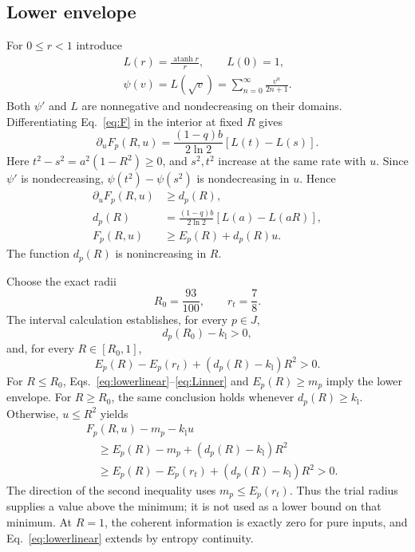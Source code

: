 \documentclass[aps,pra,reprint,amsmath,amssymb,longbibliography,nofootinbib]{revtex4-2}
\newcommand{\atanh}{\operatorname{atanh}}
\newcommand{\kl}{k_{\mathrm l}}
\begin{document}
\subsection{Lower envelope}
For $0\le r<1$ introduce
\begin{equation}
 \begin{gathered}
 L(r)=\frac{\atanh r}{r},\qquad L(0)=1,\\
 \psi(v)=L(\sqrt v)=\sum_{n=0}^{\infty}\frac{v^n}{2n+1}.
 \end{gathered}
 \label{eq:psi}
\end{equation}
Both $\psi'$ and $L$ are nonnegative and nondecreasing on their domains. Differentiating Eq.~\eqref{eq:F} in the interior at fixed $R$ gives
\begin{equation}
 \partial_uF_p(R,u)=\frac{(1-q)b}{2\ln2}[L(t)-L(s)].
 \label{eq:Fu}
\end{equation}
Here $t^2-s^2=a^2(1-R^2)\ge0$, and $s^2,t^2$ increase at the same rate with $u$. Since $\psi'$ is nondecreasing, $\psi(t^2)-\psi(s^2)$ is nondecreasing in $u$. Hence
\begin{align}
 \partial_uF_p(R,u)&\ge d_p(R),\nonumber\\
 d_p(R)&=\frac{(1-q)b}{2\ln2}[L(a)-L(aR)],\label{eq:d}\\
 F_p(R,u)&\ge E_p(R)+d_p(R)u.\label{eq:lowerlinear}
\end{align}
The function $d_p(R)$ is nonincreasing in $R$.

Choose the exact radii
\begin{equation}
 R_0=\frac{93}{100},\qquad r_t=\frac78.
 \label{eq:lowercuts}
\end{equation}
The interval calculation establishes, for every $p\in J$,
\begin{equation}
 d_p(R_0)-\kl>0,\label{eq:Linner}
\end{equation}
and, for every $R\in[R_0,1]$,
\begin{equation}
 E_p(R)-E_p(r_t)+(d_p(R)-\kl)R^2>0.
 \label{eq:Louter}
\end{equation}
For $R\le R_0$, Eqs.~\eqref{eq:lowerlinear}--\eqref{eq:Linner} and $E_p(R)\ge m_p$ imply the lower envelope. For $R\ge R_0$, the same conclusion holds whenever $d_p(R)\ge\kl$. Otherwise, $u\le R^2$ yields
\begin{equation}
 \begin{aligned}
 &F_p(R,u)-m_p-\kl u\\
 &\quad\ge E_p(R)-m_p+(d_p(R)-\kl)R^2\\
 &\quad\ge E_p(R)-E_p(r_t)+(d_p(R)-\kl)R^2>0.
 \end{aligned}
 \label{eq:outerargument}
\end{equation}
The direction of the second inequality uses $m_p\le E_p(r_t)$. Thus the trial radius supplies a value above the minimum; it is not used as a lower bound on that minimum. At $R=1$, the coherent information is exactly zero for pure inputs, and Eq.~\eqref{eq:lowerlinear} extends by entropy continuity.
\end{document}
